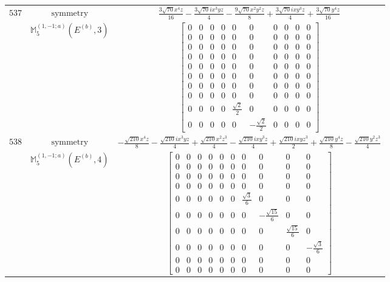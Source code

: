 \documentclass[fleqn,8pt,landscape]{jsarticle}
\begin{document}
\begin{longtable}{ccc}
$ 537 $ & $ \text{symmetry} $ & $ \frac{3 \sqrt{70} x^{4} z}{16} - \frac{3 \sqrt{70} i x^{3} y z}{4} - \frac{9 \sqrt{70} x^{2} y^{2} z}{8} + \frac{3 \sqrt{70} i x y^{3} z}{4} + \frac{3 \sqrt{70} y^{4} z}{16} $ \\
$  $ & $ \mathbb{M}_{5}^{(1,-1;a)}(E^{(b)},3) $ & $ \begin{bmatrix} 0 & 0 & 0 & 0 & 0 & 0 & 0 & 0 & 0 & 0 \\ 0 & 0 & 0 & 0 & 0 & 0 & 0 & 0 & 0 & 0 \\ 0 & 0 & 0 & 0 & 0 & 0 & 0 & 0 & 0 & 0 \\ 0 & 0 & 0 & 0 & 0 & 0 & 0 & 0 & 0 & 0 \\ 0 & 0 & 0 & 0 & 0 & 0 & 0 & 0 & 0 & 0 \\ 0 & 0 & 0 & 0 & 0 & 0 & 0 & 0 & 0 & 0 \\ 0 & 0 & 0 & 0 & 0 & 0 & 0 & 0 & 0 & 0 \\ 0 & 0 & 0 & 0 & 0 & 0 & 0 & 0 & 0 & 0 \\ 0 & 0 & 0 & 0 & \frac{\sqrt{2}}{2} & 0 & 0 & 0 & 0 & 0 \\ 0 & 0 & 0 & 0 & 0 & - \frac{\sqrt{2}}{2} & 0 & 0 & 0 & 0 \end{bmatrix} $ \\ \hline
$ 538 $ & $ \text{symmetry} $ & $ - \frac{\sqrt{210} x^{4} z}{8} - \frac{\sqrt{210} i x^{3} y z}{4} + \frac{\sqrt{210} x^{2} z^{3}}{4} - \frac{\sqrt{210} i x y^{3} z}{4} + \frac{\sqrt{210} i x y z^{3}}{2} + \frac{\sqrt{210} y^{4} z}{8} - \frac{\sqrt{210} y^{2} z^{3}}{4} $ \\
$  $ & $ \mathbb{M}_{5}^{(1,-1;a)}(E^{(b)},4) $ & $ \begin{bmatrix} 0 & 0 & 0 & 0 & 0 & 0 & 0 & 0 & 0 & 0 \\ 0 & 0 & 0 & 0 & 0 & 0 & 0 & 0 & 0 & 0 \\ 0 & 0 & 0 & 0 & 0 & 0 & 0 & 0 & 0 & 0 \\ 0 & 0 & 0 & 0 & 0 & 0 & 0 & 0 & 0 & 0 \\ 0 & 0 & 0 & 0 & 0 & 0 & \frac{\sqrt{3}}{6} & 0 & 0 & 0 \\ 0 & 0 & 0 & 0 & 0 & 0 & 0 & - \frac{\sqrt{15}}{6} & 0 & 0 \\ 0 & 0 & 0 & 0 & 0 & 0 & 0 & 0 & \frac{\sqrt{15}}{6} & 0 \\ 0 & 0 & 0 & 0 & 0 & 0 & 0 & 0 & 0 & - \frac{\sqrt{3}}{6} \\ 0 & 0 & 0 & 0 & 0 & 0 & 0 & 0 & 0 & 0 \\ 0 & 0 & 0 & 0 & 0 & 0 & 0 & 0 & 0 & 0 \end{bmatrix} $ \\ \hline

\end{longtable}
\end{document}
